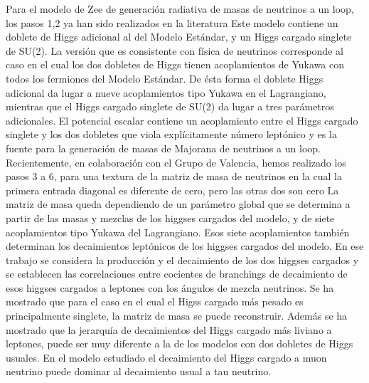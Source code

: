 \begin{ideas}
Para el modelo de Zee de generación radiativa de masas de neutrinos a
un loop, los pasos 1,2 ya han sido realizados en la literatura
Este modelo contiene un doblete de Higgs
adicional al del Modelo Estándar, y un Higgs cargado singlete de
SU(2). La versión que es consistente con física de neutrinos
corresponde al caso en el cual los dos dobletes de Higgs tienen
acoplamientos de Yukawa con todos los fermiones del Modelo Estándar.
De ésta forma el doblete Higgs adicional da lugar a nueve
acoplamientos tipo Yukawa en el Lagrangiano, mientras que el Higgs
cargado singlete de SU(2) da lugar a tres parámetros adicionales. El
potencial escalar contiene un acoplamiento entre el Higgs cargado
singlete y los dos dobletes que viola explícitamente número leptónico
y es la fuente para la generación de masas de Majorana de neutrinos a
un loop. Recientemente, en colaboración con el Grupo de Valencia,
hemos realizado los pasos 3 a 6, para una textura de la matriz de masa
de neutrinos en la cual la primera entrada diagonal es diferente de
cero, pero las otras dos son cero %
La
matriz de masa queda dependiendo de un parámetro global que se
determina a partir de las masas y mezclas de los higgses cargados del
modelo, y de siete acoplamientos tipo Yukawa del Lagrangiano. Esos
siete acoplamientos también determinan los decaimientos leptónicos de
los higgses cargados del modelo. En ese trabajo se considera la
producción y el decaimiento de los dos higgses cargados y se
establecen las correlaciones entre cocientes de branchings de
decaimiento de esos higgses cargados a leptones con los ángulos de
mezcla neutrinos. Se ha mostrado que para el caso en el cual el Higss
cargado más pesado es principalmente singlete, la matriz de masa se
puede reconstruir. Además se ha mostrado que la jerarquía de
decaimientos del Higgs cargado más liviano a leptones, puede ser muy
diferente a la de los modelos con dos dobletes de Higgs usuales.  En
el modelo estudiado el decaimiento del Higgs cargado a muon neutrino
puede dominar al decaimiento usual a tau neutrino.


\end{ideas}
